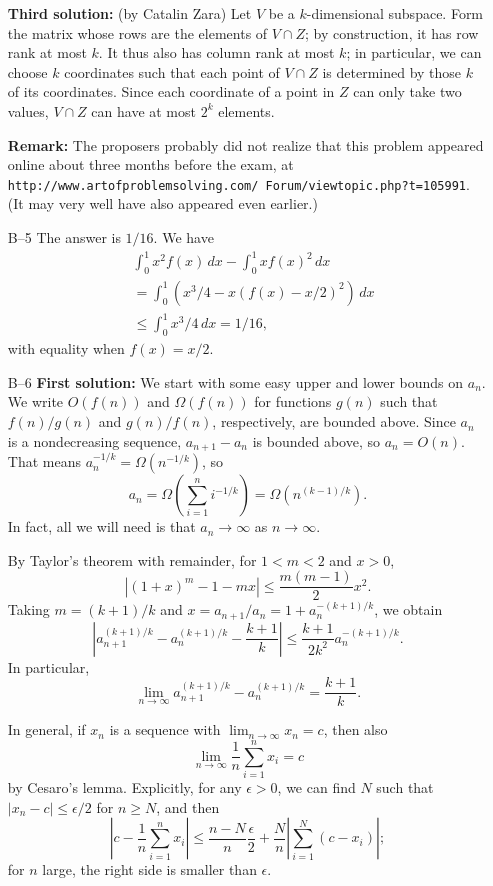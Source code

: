 \documentclass[amssymb,twocolumn,pra,10pt,aps]{revtex4-1}
\begin{document}
\begin{itemize}
\textbf{Third solution:} (by Catalin Zara)
Let $V$ be a $k$-dimensional subspace. Form the matrix whose rows are the elements
of $V \cap Z$; by construction, it has row rank at most $k$. It thus also has
column rank at most $k$; in particular, we can choose $k$ coordinates such that
each point of $V \cap Z$ is determined by those $k$ of its coordinates. Since
each coordinate of a point in $Z$ can only take two values, $V \cap Z$ can have
at most $2^k$ elements.

\textbf{Remark:} The proposers probably did not realize that this problem appeared
online about three months before the exam, at
\texttt{http://www.artofproblemsolving.com/ Forum/viewtopic.php?t=105991}. (It
may very well have also appeared even earlier.)

\item[B--5]
The answer is $1/16$. We have
\begin{align*}
&\int_0^1 x^2 f (x)\,dx - \int_0^1 x f(x)^2\,dx \\
&= \int_0^1 (x^3/4 - x
( f(x)-x/2)^2)\,dx \\
&\leq \int_0^1 x^3/4\,dx = 1/16,
\end{align*}
with equality when $f(x) = x/2$.

\item[B--6]
\textbf{First solution:}
We start with some easy
upper and lower bounds on $a_n$.
We write $O(f(n))$ and $\Omega(f(n))$ for functions $g(n)$ such that
$f(n)/g(n)$ and $g(n)/f(n)$, respectively, are bounded above.
Since $a_n$ is a nondecreasing sequence, $a_{n+1}-a_n$ is bounded above,
so $a_n = O(n)$. That means $a_n^{-1/k} = \Omega(n^{-1/k})$, so
\[
a_n = \Omega \left( \sum_{i=1}^n i^{-1/k} \right)
= \Omega(n^{(k-1)/k}).
\]
In fact, all we will need is that $a_n \to \infty$ as $n \to \infty$.

By Taylor's theorem with remainder, for $1 < m < 2$ and $x>0$,
\[
|(1+x)^m - 1 - mx| \leq \frac{m(m-1)}{2}x^2.
\]
Taking $m = (k+1)/k$ and $x = a_{n+1}/a_n = 1 + a_n^{-(k+1)/k}$, we obtain
\[
\left| a_{n+1}^{(k+1)/k} - a_n^{(k+1)/k} - \frac{k+1}{k} \right|
\leq \frac{k+1}{2k^2} a_n^{-(k+1)/k}.
\]
In particular,
\[
\lim_{n \to \infty} a_{n+1}^{(k+1)/k} - a_n^{(k+1)/k} = \frac{k+1}{k}.
\]

In general, if $x_n$ is a sequence with $\lim_{n \to \infty} x_n = c$, then
also
\[
\lim_{n \to \infty} \frac{1}{n} \sum_{i=1}^n x_i = c
\]
by Cesaro's lemma. Explicitly, for any $\epsilon > 0$, we can find $N$ such that
$|x_n - c| \leq \epsilon/2$ for $n \geq N$, and then
\[
\left| c - \frac{1}{n} \sum_{i=1}^n x_i \right|
\leq \frac{n-N}{n} \frac{\epsilon}{2} + \frac{N}{n} \left| \sum_{i=1}^N (c-x_i) \right|;
\]
for $n$ large, the right side is smaller than $\epsilon$.


\end{itemize}
\end{document}
